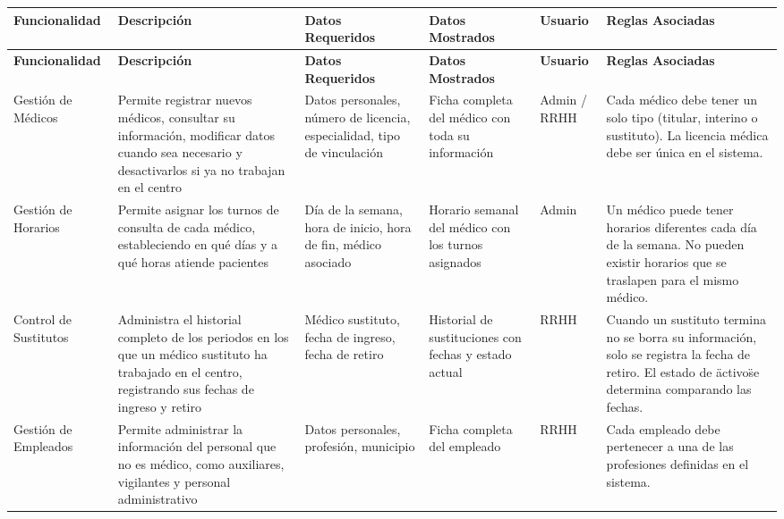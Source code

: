 \documentclass[12pt,a4paper]{article}
\begin{document}
{\footnotesize
\setlength{\tabcolsep}{4pt}
\begin{longtable}{|p{2.3cm}|p{3.5cm}|p{2.2cm}|p{2cm}|p{1.2cm}|p{2.8cm}|}
\hline
\textbf{Funcionalidad} & \textbf{Descripci\'on} & \textbf{Datos Requeridos} & \textbf{Datos Mostrados} & \textbf{Usuario} & \textbf{Reglas Asociadas} \\ \hline
\endfirsthead
\hline
\textbf{Funcionalidad} & \textbf{Descripci\'on} & \textbf{Datos Requeridos} & \textbf{Datos Mostrados} & \textbf{Usuario} & \textbf{Reglas Asociadas} \\ \hline
\endhead

Gesti\'on de M\'edicos &
Permite registrar nuevos m\'edicos, consultar su informaci\'on, modificar datos cuando sea necesario y desactivarlos si ya no trabajan en el centro &
Datos personales, n\'umero de licencia, especialidad, tipo de vinculaci\'on &
Ficha completa del m\'edico con toda su informaci\'on &
Admin / RRHH &
Cada m\'edico debe tener un solo tipo (titular, interino o sustituto). La licencia m\'edica debe ser \'unica en el sistema. \\ \hline

Gesti\'on de Horarios &
Permite asignar los turnos de consulta de cada m\'edico, estableciendo en qu\'e d\'ias y a qu\'e horas atiende pacientes &
D\'ia de la semana, hora de inicio, hora de fin, m\'edico asociado &
Horario semanal del m\'edico con los turnos asignados &
Admin &
Un m\'edico puede tener horarios diferentes cada d\'ia de la semana. No pueden existir horarios que se traslapen para el mismo m\'edico. \\ \hline

Control de Sustitutos &
Administra el historial completo de los periodos en los que un m\'edico sustituto ha trabajado en el centro, registrando sus fechas de ingreso y retiro &
M\'edico sustituto, fecha de ingreso, fecha de retiro &
Historial de sustituciones con fechas y estado actual &
RRHH &
Cuando un sustituto termina no se borra su informaci\'on, solo se registra la fecha de retiro. El estado de \"activo\" se determina comparando las fechas. \\ \hline

Gesti\'on de Empleados &
Permite administrar la informaci\'on del personal que no es m\'edico, como auxiliares, vigilantes y personal administrativo &
Datos personales, profesi\'on, municipio &
Ficha completa del empleado &
RRHH &
Cada empleado debe pertenecer a una de las profesiones definidas en el sistema. \\ \hline


\end{longtable}}
\end{document}
